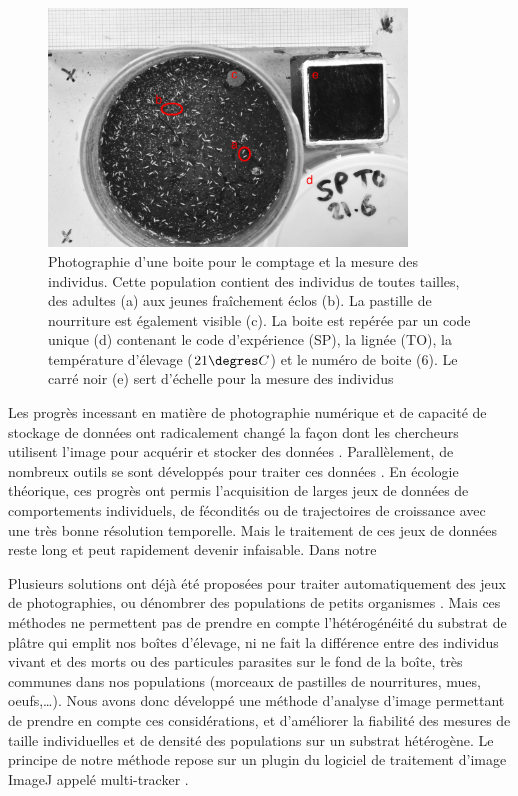 \begin{figure}[!ht]
\begin{center}
\includegraphics[width=0.85\textwidth]{1_CorpsDeThese/Methodo/PhotoCount}
\caption[ Photo d’une boite pour le
comptage et la mesure des individus]{Photographie d'une boite pour le comptage
et la mesure des individus. Cette population contient des individus de toutes
tailles, des adultes (a) aux jeunes fraîchement éclos (b). La pastille de
nourriture est également visible (c). La boite est repérée par un code unique
(d) contenant le code d'expérience (SP), la lignée (TO), la température
d'élevage ($21\degres C$) et le numéro de boite (6). Le carré noir (e) sert
d'échelle pour la mesure des individus}
\label{fig:photocount}
\end{center}
\end{figure}

Les progrès incessant en matière de photographie numérique et de capacité de
stockage de données ont radicalement changé la façon dont les chercheurs
utilisent l'image pour acquérir et stocker des données \autocites{walter2005a}.
Parallèlement, de nombreux outils se sont développés pour traiter ces données
\autocites{eliceiri2012a,schneider2012a}. En écologie théorique, ces progrès ont
permis l'acquisition de larges jeux de données de comportements individuels, de
fécondités ou de trajectoires de croissance avec une très bonne résolution
temporelle. Mais le traitement de ces jeux de données reste long et peut
rapidement devenir infaisable. Dans notre 

Plusieurs solutions ont déjà été proposées pour traiter automatiquement des jeux
de photographies, ou dénombrer des populations de petits organismes
\autocites{hooper2006a,krogh1998a,auclerc2010a,lukas2009a,marcal2006a}. Mais ces
méthodes ne permettent pas de prendre en compte l'hétérogénéité du substrat de
plâtre qui emplit nos boîtes d'élevage, ni ne fait la différence entre des
individus vivant et des morts ou des particules parasites sur le fond de la
boîte, très communes dans nos populations (morceaux de pastilles de
nourritures, mues, oeufs,\ldots). Nous avons donc développé une méthode
d'analyse d'image permettant de prendre en compte ces considérations, et
d'améliorer la fiabilité des mesures de taille individuelles et de densité des
populations sur un substrat hétérogène. Le principe de notre méthode repose sur
un plugin du logiciel de traitement d'image ImageJ appelé multi-tracker
\autocites{schneider2012a,kuhn2001a}.

